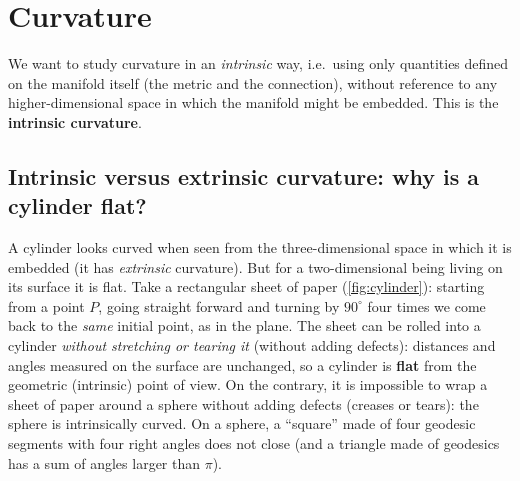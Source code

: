 \chapter{Curvature}\label{ch:curvature}

We want to study curvature in an \emph{intrinsic} way, i.e.\ using only quantities defined on the manifold itself (the metric and the connection), without reference to any higher-dimensional space in which the manifold might be embedded. This is the \textbf{intrinsic curvature}.

\section{Intrinsic versus extrinsic curvature: why is a cylinder flat?}

A cylinder looks curved when seen from the three-dimensional space in which it is embedded (it has \emph{extrinsic} curvature). But for a two-dimensional being living on its surface it is flat. Take a rectangular sheet of paper (\cref{fig:cylinder}): starting from a point $P$, going straight forward and turning by $90^\circ$ four times we come back to the \emph{same} initial point, as in the plane. The sheet can be rolled into a cylinder \emph{without stretching or tearing it} (without adding defects): distances and angles measured on the surface are unchanged, so a cylinder is \textbf{flat} from the geometric (intrinsic) point of view. On the contrary, it is impossible to wrap a sheet of paper around a sphere without adding defects (creases or tears): the sphere is intrinsically curved. On a sphere, a ``square'' made of four geodesic segments with four right angles does not close (and a triangle made of geodesics has a sum of angles larger than $\pi$).

